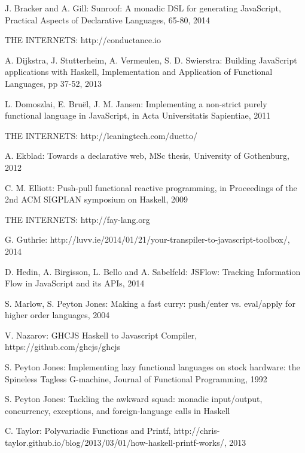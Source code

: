 \documentclass[preprint]{sigplanconf}
\begin{document}
\begin{thebibliography}{}
\softraggedright

J. Bracker and A. Gill: Sunroof: A monadic DSL for generating JavaScript, Practical Aspects of Declarative Languages, 65-80, 2014

THE INTERNETS: http://conductance.io

A. Dijkstra, J. Stutterheim, A. Vermeulen, S. D. Swierstra: Building JavaScript applications with Haskell, Implementation and Application of Functional Languages, pp 37-52, 2013

L. Domoszlai, E. Bruël, J. M. Jansen: Implementing a non-strict purely functional language in JavaScript, in Acta Universitatis Sapientiae, 2011

THE INTERNETS: http://leaningtech.com/duetto/

A. Ekblad: Towards a declarative web, MSc thesis, University of Gothenburg, 2012

C. M. Elliott: Push-pull functional reactive programming, in Proceedings of the 2nd ACM SIGPLAN symposium on Haskell, 2009

THE INTERNETS: http://fay-lang.org

G. Guthrie: http://luvv.ie/2014/01/21/your-transpiler-to-javascript-toolbox/, 2014

D. Hedin, A. Birgisson, L. Bello and A. Sabelfeld: JSFlow: Tracking Information Flow in JavaScript and its APIs, 2014

S. Marlow, S. Peyton Jones: Making a fast curry: push/enter vs. eval/apply for higher order languages, 2004

V. Nazarov: GHCJS Haskell to Javascript Compiler, https://github.com/ghcjs/ghcjs

S. Peyton Jones: Implementing lazy functional languages on stock hardware: the Spineless Tagless G-machine, Journal of Functional Programming, 1992

S. Peyton Jones: Tackling the awkward squad: monadic input/output, concurrency, exceptions, and foreign-language calls in Haskell

C. Taylor: Polyvariadic Functions and Printf, http://chris-taylor.github.io/blog/2013/03/01/how-haskell-printf-works/, 2013

\end{thebibliography}
\end{document}
